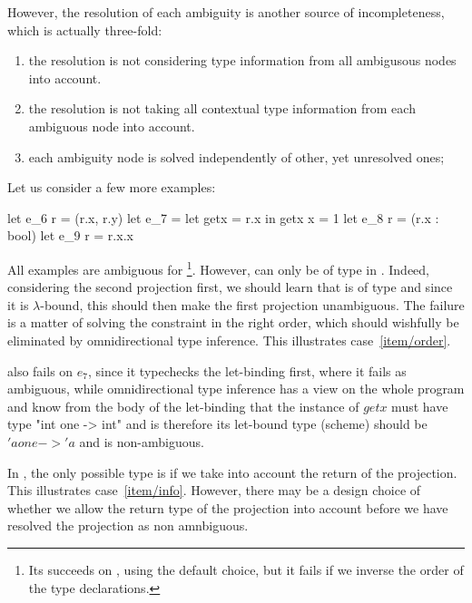 \documentclass[acmsmall,screen,nonacm]{acmart}
\begin{document}
However, the resolution of each ambiguity is another source of
incompleteness, which is actually three-fold:
\begin{enumerate}
\item\label {item/order}
  the resolution is not considering type information from all ambigusous
  nodes into account.
\item\label {item/info}
  the resolution is not taking all contextual type information from
  each ambiguous node into account.
\item\label {item/simultaneous}
  each ambiguity node is solved independently of other, yet unresolved ones;
\end{enumerate}
Let us consider a few more examples:
\begin{program}[error]
let e_6 r = (r.x, r.y)
let e_7 = let getx = r.x in getx {x = 1}
let e_8 r = (r.x : bool)
let e_9 r = r.x.x
\end{program}
All examples are ambiguous for \OCaml\footnote{Its succeeds on ,
using the default choice, but it fails if we inverse the order of the type
declarations.}.  However,  can only be of type
 in . Indeed, considering the second projection first,
we should learn that  is of type  and since it is
$\lambda$-bound, this should then make the first projection unambiguous.
The failure is a matter of solving the constraint in the right order, which
should wishfully be eliminated by omnidirectional type inference.
This illustrates case~\ref {item/order}.

\OCaml also fails on \ocaml$e_7$, since it typechecks the let-binding first,
where it fails as ambiguous, while omnidirectional type inference
has a view on the whole program and know from the body of the let-binding
that the instance of $getx$ must have type \ocaml"int one -> int" and is
therefore its let-bound type (scheme) should be \ocaml$'a one -> 'a$ and is
non-ambiguous. 

In , the only possible type is  if we take into account
the return of the projection. This illustrates case~\ref {item/info}.
However, there may be a design choice of whether we allow the return type of
the projection into account before we have resolved the projection as non
amnbiguous.
\end{document}
